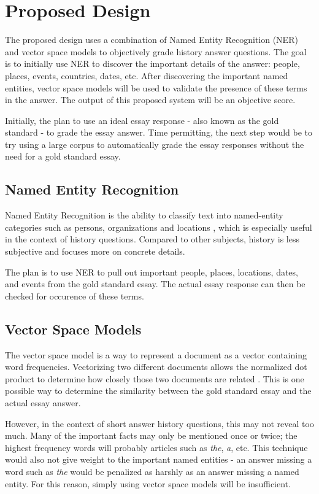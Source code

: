 \section{Proposed Design}
\label{section:propeseddesign}
The proposed design uses a combination of Named Entity Recognition (NER) and vector space models to objectively grade history answer questions. The goal is to initially use NER to discover the important details of the answer: people, places, events, countries, dates, etc. After discovering the important named entities, vector space models will be used to validate the presence of these terms in the answer. The output of this proposed system will be an objective score.

Initially, the plan to use an ideal essay response - also known as the gold standard - to grade the essay answer. Time permitting, the next step would be to try using a large corpus to automatically grade the essay responses without the need for a gold standard essay.

\subsection{Named Entity Recognition}
 Named Entity Recognition is the ability to classify text into named-entity categories such as persons, organizations and locations \cite{recognizing_named_entities_in_tweets}, which is especially useful in the context of history questions. Compared to other subjects, history is less subjective and focuses more on concrete details.

 The plan is to use NER to pull out important people, places, locations, dates, and events from the gold standard essay. The actual essay response can then be checked for occurence of these terms.

 \subsection{Vector Space Models}
The vector space model is a way to represent a document as a vector containing word frequencies. Vectorizing two different documents allows the normalized dot product to determine how closely those two documents are related \cite{the_book}. This is one possible way to determine the similarity between the gold standard essay and the actual essay answer.

However, in the context of short answer history questions, this may not reveal too much. Many of the important facts may only be mentioned once or twice; the highest frequency words will probably articles such as \textit{the}, \textit{a}, etc. This technique would also not give weight to the important named entities - an answer missing a word such as \textit{the} would be penalized as harshly as an answer missing a named entity. For this reason, simply using vector space models will be insufficient.

